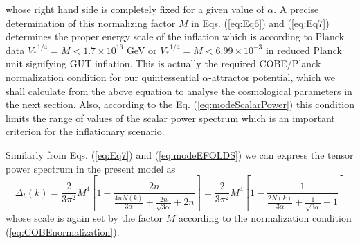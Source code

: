 \documentclass[a4paper,11pt]{article}
\begin{document}
whose right hand side is completely fixed for a given value of $\alpha$. A precise determination of this normalizing factor $M$ in Eqs. (\ref{eq:Eq6}) and (\ref{eq:Eq7}) determines the proper energy scale of the inflation which is according to Planck data ${V_{*}}^{1/4} = M<1.7\times 10^{16}$ GeV or ${V_{*}}^{1/4} = M<6.99\times 10^{-3}$ in reduced Planck unit signifying GUT inflation. This is actually the required COBE/Planck normalization condition for our quintessential $\alpha$-attractor potential, which we shall calculate from the above equation to analyse the cosmological parameters in the next section. Also, according to the Eq. (\ref{eq:modeScalarPower}) this condition limits the range of values of the scalar power spectrum which is an important criterion for the inflationary scenario.\par Similarly from Eqs. (\ref{eq:Eq7}) and (\ref{eq:modeEFOLDS}) we can express the tensor power spectrum in the present model as
\begin{equation}
    \Delta_t(k) = \frac{2}{3\pi^2}M^4\left[1-\frac{2n}{\frac{4nN(k)}{3\alpha}+\frac{2n}{\sqrt{3\alpha}}+2n}\right]=\frac{2}{3\pi^2}M^4\left[1-\frac{1}{\frac{2N(k)}{3\alpha}+\frac{1}{\sqrt{3\alpha}}+1}\right]
    \label{eq:modeTensorPOWER}
\end{equation} whose scale is again set by the factor $M$ according to the normalization condition (\ref{eq:COBEnormalization}).
\end{document}
